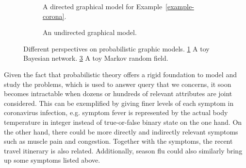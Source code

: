 \begin{figure}[!t]
  \begin{subfigure}{.4\textwidth}
    \caption{A directed graphical model for Example~\ref{example-corona}.}
    \label{fig:dag-coronavirus}
  \end{subfigure}\hspace{2.5cm}
  \begin{subfigure}{0.3\textwidth}
    \caption{An undirected graphical model.}
    \label{fig:mrf-communication}
  \end{subfigure}
  \caption{Different perspectives on probabilistic graphic models. \ref{fig:dag-coronavirus} A toy Bayesian network. \ref{fig:mrf-communication} A toy Markov random field.}
  \hspace{1cm}
\end{figure}


Given the fact that probabilistic theory offers a rigid foundation to model and study the problems, which is used to answer query that we concerns, it soon becomes intractable when dozens or hundreds of relevant attributes are joint considered. This can be exemplified by giving finer levels of each symptom in coronavirus infection, e.g. symptom fever is represented by the actual body temperature in integer instead of true-or-false binary state on the one hand. On the other hand, there could be more directly and indirectly relevant symptoms such as muscle pain and congestion. Together with the symptoms, the recent travel itinerary is also related. Additionally, season flu could also similarly bring up some symptoms listed above. 

